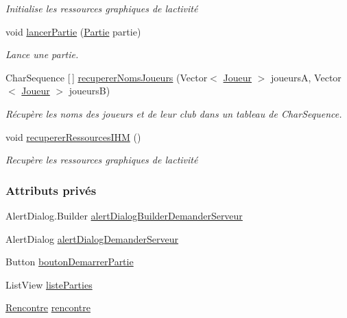 \begin{DoxyCompactItemize}
\begin{DoxyCompactList}\small\item\em Initialise les ressources graphiques de l\textquotesingle{}activité \end{DoxyCompactList}\item 
void \hyperlink{classcom_1_1example_1_1area_1_1_i_h_m_gestion_rencontre_a284518fddedfaed4b257f852290e1e63}{lancer\+Partie} (\hyperlink{classcom_1_1example_1_1area_1_1_partie}{Partie} partie)
\begin{DoxyCompactList}\small\item\em Lance une partie. \end{DoxyCompactList}\item 
Char\+Sequence \mbox{[}$\,$\mbox{]} \hyperlink{classcom_1_1example_1_1area_1_1_i_h_m_gestion_rencontre_ae68b1e5d73d33d01e622a736a25da731}{recuperer\+Noms\+Joueurs} (Vector$<$ \hyperlink{classcom_1_1example_1_1area_1_1_joueur}{Joueur} $>$ joueursA, Vector$<$ \hyperlink{classcom_1_1example_1_1area_1_1_joueur}{Joueur} $>$ joueursB)
\begin{DoxyCompactList}\small\item\em Récupère les noms des joueurs et de leur club dans un tableau de Char\+Sequence. \end{DoxyCompactList}\item 
void \hyperlink{classcom_1_1example_1_1area_1_1_i_h_m_gestion_rencontre_ac3d024fe8637e7cc4469a88a7ab81b53}{recuperer\+Ressources\+I\+HM} ()
\begin{DoxyCompactList}\small\item\em Recupère les ressources graphiques de l\textquotesingle{}activité \end{DoxyCompactList}\end{DoxyCompactItemize}
\subsubsection*{Attributs privés}
\begin{DoxyCompactItemize}
\item 
Alert\+Dialog.\+Builder \hyperlink{classcom_1_1example_1_1area_1_1_i_h_m_gestion_rencontre_a47ed7018b2af1ac9197715b9008a34a5}{alert\+Dialog\+Builder\+Demander\+Serveur}
\item 
Alert\+Dialog \hyperlink{classcom_1_1example_1_1area_1_1_i_h_m_gestion_rencontre_a9e68d97c4b50758ce1d6a2d8a217d5fc}{alert\+Dialog\+Demander\+Serveur}
\item 
Button \hyperlink{classcom_1_1example_1_1area_1_1_i_h_m_gestion_rencontre_a29f52b3b1397d21728bbe60b826facd8}{bouton\+Demarrer\+Partie}
\item 
List\+View \hyperlink{classcom_1_1example_1_1area_1_1_i_h_m_gestion_rencontre_a127e07e7de6ff7e02fa84c52a3399aaa}{liste\+Parties}
\item 
\hyperlink{classcom_1_1example_1_1area_1_1_rencontre}{Rencontre} \hyperlink{classcom_1_1example_1_1area_1_1_i_h_m_gestion_rencontre_aa3ecacbd8ab104d2a3c3f3e727ae6c5c}{rencontre}
\end{DoxyCompactItemize}
